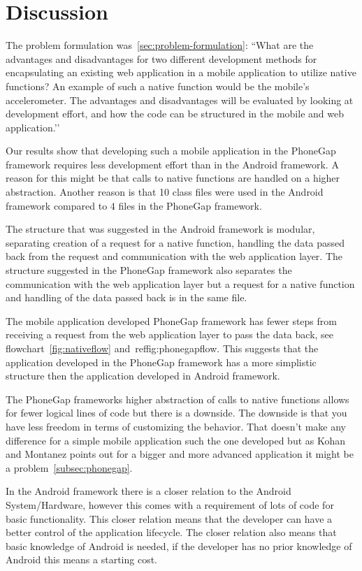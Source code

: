 \chapter{Discussion} \label{ch:discussion}
The problem formulation was~\ref{sec:problem-formulation}:
``What are the advantages and disadvantages for two different development methods for encapsulating an existing web application in a mobile application to utilize native functions? An example of such a native function would be the mobile's accelerometer. The advantages and disadvantages will be evaluated by looking at development effort, and how the code can be structured in the mobile and web application.’’

Our results show that developing such a mobile application in the PhoneGap framework requires less development effort than in the Android framework. A reason for this might be that calls to native functions are handled on a higher abstraction. Another reason is that 10 class files were used in the Android framework compared to 4 files in the PhoneGap framework.

The structure that was suggested in the Android framework is modular, separating creation of a request for a native function, handling the data passed back from the request and communication with the web application layer. The structure suggested in the PhoneGap framework also separates the communication with the web application layer but a request for a native function and handling of the data passed back is in the same file. 

The mobile application developed PhoneGap framework has fewer steps from receiving a request from the web application layer to pass the data back, see flowchart~\ref{fig:nativeflow} and~ref{fig:phonegapflow}. This suggests that the application developed in the PhoneGap framework has a more simplistic structure then the application developed in Android framework.

The PhoneGap frameworks higher abstraction of calls to native functions allows for fewer logical lines of code but there is a downside. The downside is that you have less freedom in terms of customizing the behavior. That doesn’t make any difference for a simple mobile application such the one developed but as Kohan and Montanez points out for a bigger and more advanced application it might be a problem~\ref{subsec:phonegap}. 

In the Android framework there is a closer relation to the Android System/Hardware, however this comes with a requirement of lots of code for basic functionality. This closer relation means that the developer can have a better control of the application lifecycle. The closer relation also means that basic knowledge of Android is needed, if the developer has no prior knowledge of Android this means a starting cost. 

